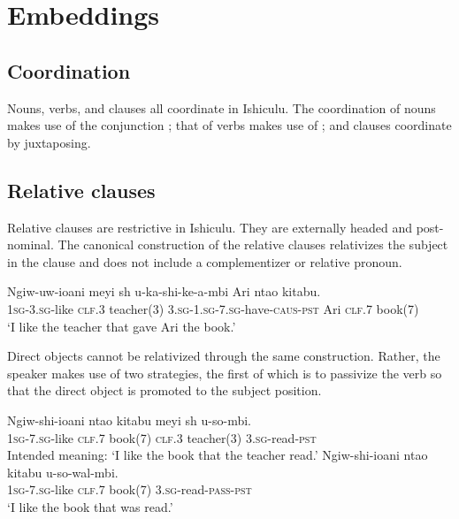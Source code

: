 \chapter{Embeddings}

\section{Coordination}

Nouns, verbs, and clauses all coordinate in Ishiculu. The coordination of nouns makes use of the conjunction \textit{}; that of verbs makes use of \textit{}; and clauses coordinate by juxtaposing.

\section{Relative clauses}

Relative clauses are restrictive in Ishiculu. They are externally headed and post-nominal. The canonical construction of the relative clauses relativizes the subject in the clause and does not include a complementizer or relative pronoun.

\begin{exe}
\ex
\gll Ngiw-uw-ioani meyi {sh\textramshorns} u-ka-shi-ke-\textbeltl a-mbi Ari nta\textbeltl o kitabu. \\
\textsc{1sg}-\textsc{3.sg}-like \textsc{clf.3} teacher(3) \textsc{3.sg}-\textsc{1.sg}-\textsc{7.sg}-have-\textsc{caus}-\textsc{pst} Ari \textsc{clf.7} book(7) \\
\trans `I like the teacher that gave Ari the book.'
\end{exe}

Direct objects cannot be relativized through the same construction. Rather, the speaker makes use of two strategies, the first of which is to passivize the verb so that the direct object is promoted to the subject position.

\begin{exe}
\ex
\gll * Ngiw-shi-ioani nta\textbeltl o kitabu meyi {sh\textramshorns} u-so-mbi. \\
{} \textsc{1sg}-\textsc{7.sg}-like \textsc{clf.7} book(7) \textsc{clf.3} teacher(3) \textsc{3.sg}-read-\textsc{pst} \\
\trans Intended meaning: `I like the book that the teacher read.'
\ex
\gll Ngiw-shi-ioani nta\textbeltl o kitabu u-so-wal\textramshorns-mbi. \\
\textsc{1sg}-\textsc{7.sg}-like \textsc{clf.7} book(7)  \textsc{3.sg}-read-\textsc{pass}-\textsc{pst} \\
\trans `I like the book that was read.'
\end{exe}

